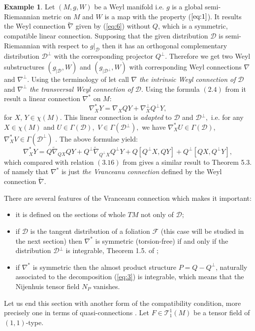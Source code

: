 \documentclass[11pt,oneside,english]{amsart}
\numberwithin{equation}{section}
\numberwithin{figure}{section}
\theoremstyle{plain}
\theoremstyle{definition}
\theoremstyle{definition}
\newtheorem{example}[thm]{Example}
\theoremstyle{plain}
\theoremstyle{plain}
\theoremstyle{remark}
\theoremstyle{remark}
\begin{document}
\begin{example}
Let $(M,g,W)$ be a Weyl manifold \cite{f:l} i.e. $g$ is a global
semi-Riemannian metric on $M$ and $W$ is a map with the property
($\ref{eq:1}$). It results the Weyl connection $\tilde{\nabla}$
given by (\ref{eq:6}) without $Q$, which is a symmetric, compatible
linear connection. Supposing that the given distribution $\mathcal{D}$
is semi-Riemannian with respect to $g|_{\mathcal{D}}$ then it has
an orthogonal complementary distribution $\mathcal{D}^{\bot}$ with
the corresponding projector $Q^{\bot}$. Therefore we get two Weyl
substructures $(g_{|\mathcal{D}},W)$ and $(g_{|\mathcal{D}{}^{\bot}},W)$
with corresponding Weyl connections $\nabla$ and $\nabla^{\bot}$.
Using the terminology of \cite[p. 96]{b:f} let call $\nabla$ \textit{the
intrinsic Weyl connection of} $\mathcal{D}$ and $\nabla^{\bot}$
\textit{the transversal Weyl connection of} $\mathcal{D}.$ Using
the formula $(2.4)$ from \cite[p. 7]{b:f} it result a linear connection
$\nabla^{*}$ on $M$: \begin{equation}
\nabla_{X}^{*}Y=\nabla_{X}QY+\nabla_{X}^{\bot}Q^{\bot}Y,\label{eq:8}\end{equation}
 for $X,\, Y\in\chi(M).$ This linear connection is \textit{adapted}
to $\mathcal{D}$ and $\mathcal{D}{}^{\bot},$ i.e. for any $X\in\chi(M)$
and $U\in\Gamma(\mathcal{D})$,~$V\in\Gamma(\mathcal{D}{}^{\bot}),$
we have $\nabla_{X}^{*}U\in\Gamma(\mathcal{D})$, $\nabla_{X}^{*}V\in\Gamma(\mathcal{D^{\perp}})$
\cite[p. 7]{b:f}. The above formulae yield: \begin{equation}
\nabla_{X}^{*}Y=Q\tilde{\nabla}_{QX}QY+Q^{\bot}\tilde{\nabla}_{Q^{\perp}X}Q^{\bot}Y+Q[Q^{\bot}X,QY]+Q^{\bot}[QX,Q^{\bot}Y],\label{eq:9}\end{equation}
 which compared with relation $(3.16)$ from \cite[p. 17]{b:f} gives
a similar result to Theorem 5.3. of \cite[p. 26]{b:f} namely that
$\nabla^{*}$ is just \textit{the Vranceanu connection} defined by
the Weyl connection $\tilde{\nabla}$.
\end{example}
There are several features of the Vranceanu connection which makes
it important:

\begin{itemize}
\item it is defined on the sections of whole $TM$ not only of $\mathcal{D};$ 
\item if $\mathcal{D}$ is the tangent distribution of a foliation $\mathcal{F}$
(this case will be studied in the next section) then $\nabla^{*}$
is symmetric (torsion-free) if and only if the distribution $\mathcal{D}\mathcal{}^{\bot}$
is integrable, Theorem 1.5. of \cite[p. 100]{b:f};
\item if $\nabla^{*}$ is symmetric then the almost product structure $P=Q-Q^{\bot}$,
naturally associated to the decomposition (\ref{eq:3}) is integrable,
which means that the Nijenhuis tensor field $N_{P}$ vanishes.\\

\end{itemize}
Let us end this section with another form of the compatibility condition,
more precisely one in terms of quasi-connections \cite[p. 660]{s:h}.
Let $F\in\mathcal{T}_{1}^{1}(M)$ be a tensor field of $(1,1)$-type. 
\end{document}
